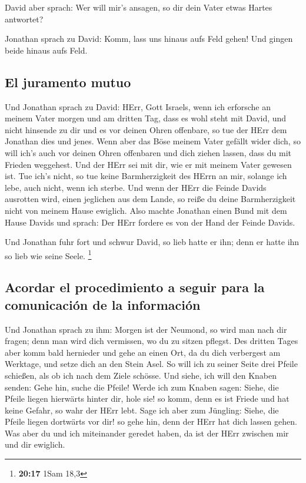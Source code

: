  David aber sprach: Wer will mir's ansagen, so dir dein
Vater etwas Hartes antwortet?

 Jonathan sprach zu David: Komm, lass uns hinaus aufs
Feld gehen! Und gingen beide hinaus aufs Feld.

\hypertarget{el-juramento-mutuo}{%
\subsection{El juramento mutuo}\label{el-juramento-mutuo}}

 Und Jonathan sprach zu David: HErr, Gott Israels, wenn
ich erforsche an meinem Vater morgen und am dritten Tag, dass es wohl
steht mit David, und nicht hinsende zu dir und es vor deinen Ohren
offenbare,  so tue der HErr dem Jonathan dies und jenes.
Wenn aber das Böse meinem Vater gefällt wider dich, so will ich's auch
vor deinen Ohren offenbaren und dich ziehen lassen, dass du mit Frieden
weggehest. Und der HErr sei mit dir, wie er mit meinem Vater gewesen
ist.  Tue ich's nicht, so tue keine Barmherzigkeit des
HErrn an mir, solange ich lebe, auch nicht, wenn ich sterbe.
 Und wenn der HErr die Feinde Davids ausrotten wird,
einen jeglichen aus dem Lande, so reiße du deine Barmherzigkeit nicht
von meinem Hause ewiglich.  Also machte Jonathan einen
Bund mit dem Hause Davids und sprach: Der HErr fordere es von der Hand
der Feinde Davids.

 Und Jonathan fuhr fort und schwur David, so lieb hatte
er ihn; denn er hatte ihn so lieb wie seine Seele. \footnote{\textbf{20:17}
  1Sam 18,3}

\hypertarget{acordar-el-procedimiento-a-seguir-para-la-comunicaciuxf3n-de-la-informaciuxf3n}{%
\subsection{Acordar el procedimiento a seguir para la comunicación de la
información}\label{acordar-el-procedimiento-a-seguir-para-la-comunicaciuxf3n-de-la-informaciuxf3n}}

 Und Jonathan sprach zu ihm: Morgen ist der Neumond, so
wird man nach dir fragen; denn man wird dich vermissen, wo du zu sitzen
pflegst.  Des dritten Tages aber komm bald hernieder und
gehe an einen Ort, da du dich verbergest am Werktage, und setze dich an
den Stein Asel.  So will ich zu seiner Seite drei Pfeile
schießen, als ob ich nach dem Ziele schösse.  Und siehe,
ich will den Knaben senden: Gehe hin, suche die Pfeile! Werde ich zum
Knaben sagen: Siehe, die Pfeile liegen hierwärts hinter dir, hole sie!
so komm, denn es ist Friede und hat keine Gefahr, so wahr der HErr lebt.
 Sage ich aber zum Jüngling: Siehe, die Pfeile liegen
dortwärts vor dir! so gehe hin, denn der HErr hat dich lassen gehen.
 Was aber du und ich miteinander geredet haben, da ist
der HErr zwischen mir und dir ewiglich.

